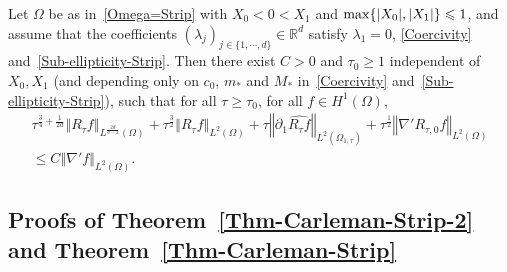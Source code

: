 \documentclass[10pt]{amsart}
\theoremstyle{definition}\newtheorem{defi}[theo]{Definition}\newtheorem{rema}[theo]{Remark}\newtheorem{exam}[theo]{Example}\newtheorem{exem}[theo]{Example}\newtheorem{nota}[theo]{Notation}
\newcommand*\R{\mathbb{R}}
\newcommand{\norm}[1]{\left\Vert#1\right\Vert}
\renewcommand{\leq}{\leqslant}
\renewcommand{\geq}{\geqslant}
\begin{document}
\begin{prop}\label{Prop-OpNorm-Est-R-tau}
Let $\Omega$ be as in~\eqref{Omega=Strip} with $X_0 \! <\! 0\! <\! X_1$ and $\max\{|X_0|, |X_1|\}\linebreak \leq 1$, and assume that the coefficients $(\lambda_j)_{j \in \{1,\cdots,d\}} \in \R^d$ satisfy $\lambda_1 = 0$, \eqref{Coercivity} and~\eqref{Sub-ellipticity-Strip}. Then there exist $C>0$ and $\tau_0 \geq 1$ independent of $X_0, X_1$ (and depending only on $c_0$, $m_*$ and $M_*$ in~\eqref{Coercivity} and~\eqref{Sub-ellipticity-Strip}), such that for all $\tau \geq \tau_0$, for all $f \in H^1(\Omega)$,
\begin{multline*}
\tau^{\frac{3}{4}+\frac{1}{2d}} \norm{R_{\tau} f}_{L^{\frac{2d}{d-2}}(\Omega)} +
\tau^{\frac{3}{2}} \norm{R_{\tau} f}_{L^{2}(\Omega)} +
\tau
\norm{\partial_1 \widehat{ R_{\tau} f}}_{L^2(\Omega_{1, \tau})} +
\tau^{\frac{1}{2}} \norm{\nabla' R_{\tau,0} f}_{L^2(\Omega)}\\
\leq C \norm{\nabla' f}_{L^2(\Omega)}.
\end{multline*}
\end{prop}

\subsection{Proofs of Theorem~\ref{Thm-Carleman-Strip-2} and Theorem~\ref{Thm-Carleman-Strip}}
\end{document}
